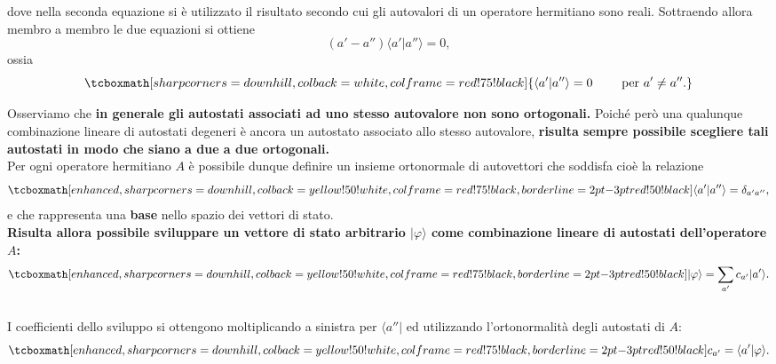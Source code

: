 \begin{enumerate}
\begin{equation}
	\end{equation}
dove nella seconda equazione si è utilizzato il risultato secondo cui gli autovalori di un operatore hermitiano sono reali. Sottraendo allora membro a membro le due equazioni si ottiene
	\begin{equation}
		(a'-a'') \langle a' \vert a'' \rangle =0,
	\end{equation}
ossia
	\begin{equation}
		\tcboxmath[sharp corners=downhill ,colback=white,colframe=red!75!black]{
		\langle a' \vert a'' \rangle =0 \qquad \textrm{ per } a' \neq a'' .
		}
	\end{equation}
\end{enumerate}

Osserviamo che \textbf{in generale gli autostati associati ad uno stesso autovalore non sono ortogonali.} Poiché però una qualunque combinazione lineare di autostati degeneri è ancora un autostato associato allo stesso autovalore, \textbf{risulta sempre possibile scegliere tali autostati in modo che siano a due a due ortogonali.}\\

Per ogni operatore hermitiano $A$ è possibile dunque definire un insieme ortonormale di autovettori che soddisfa cioè la relazione 
	\begin{equation}
		\tcboxmath[enhanced,sharp corners=downhill ,colback=yellow!50!white,colframe=red!75!black, borderline={2pt}{-3pt}{red!50!black}]{
			\langle a' \vert a'' \rangle = \delta _{a' a''},
			}
	\end{equation}
e che rappresenta una \textbf{base} nello spazio dei vettori di stato.\\

\textbf{Risulta allora possibile sviluppare un vettore di stato arbitrario $\vert \varphi \rangle $ come combinazione lineare di autostati dell'operatore $A$:}
	\begin{equation}
		\tcboxmath[enhanced,sharp corners=downhill ,colback=yellow!50!white,colframe=red!75!black, borderline={2pt}{-3pt}{red!50!black}]{
			\vert \varphi \rangle = \sum _{a'} c_{a'} \vert a' \rangle .
			}
	\end{equation}
\\

I coefficienti dello sviluppo si ottengono moltiplicando  a sinistra per $\langle a'' \vert $ ed utilizzando l'ortonormalità degli autostati di $A$:
	\begin{equation}
		\tcboxmath[enhanced,sharp corners=downhill ,colback=yellow!50!white,colframe=red!75!black, borderline={2pt}{-3pt}{red!50!black}]{
			c_{a'} = \langle a' \vert \varphi \rangle .
			}
	\end{equation}
	\\
	
